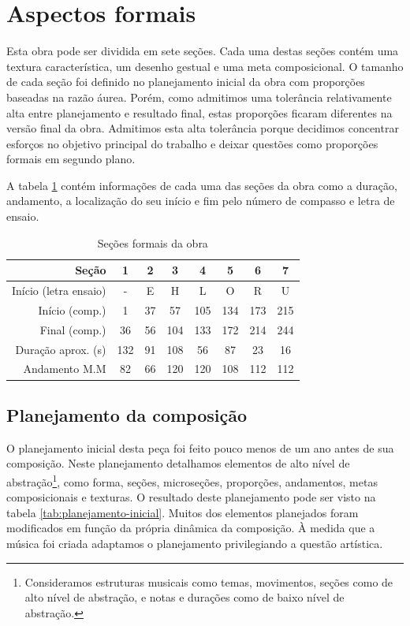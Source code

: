 \section{Aspectos formais}
\label{sec:aspectos-formais}

Esta obra pode ser dividida em sete seções. Cada uma destas seções
contém uma textura característica, um desenho gestual e uma meta
composicional.
O tamanho de cada seção foi definido no planejamento inicial da obra
com proporções baseadas na razão áurea.
Porém, como admitimos uma tolerância relativamente alta entre
planejamento e resultado final, estas proporções ficaram diferentes na
versão final da obra. Admitimos esta alta tolerância porque decidimos
concentrar esforços no objetivo principal do trabalho e deixar
questões como proporções formais em segundo plano.

A tabela \ref{tab:secoes-obra} contém informações de cada uma das
seções da obra como a duração, andamento, a localização do seu início
e fim pelo número de compasso e letra de ensaio.

\begin{table}
  \centering
  \begin{tabular}{r|ccccccc}
    Seção & 1 & 2 & 3 & 4 & 5 & 6 & 7 \\
    \hline
    Início (letra ensaio) & - & E & H & L & O & R & U \\
    Início (comp.) & 1 & 37 & 57 & 105 & 134 & 173 & 215 \\
    Final (comp.) & 36 & 56 & 104 & 133 & 172 & 214 & 244 \\
    Duração aprox. (s) & 132 & 91 & 108 & 56 & 87 & 23 & 16\\
    Andamento M.M & 82 & 66 & 120 & 120 & 108 & 112 & 112 \\
  \end{tabular}
  \caption{Seções formais da obra}
  \label{tab:secoes-obra}
\end{table}

\subsection{Planejamento da composição}
\label{sec:plan-da-comp}

O planejamento inicial desta peça foi feito pouco menos de um ano
antes de sua composição. Neste planejamento detalhamos elementos de
alto nível de abstração\footnote{Consideramos estruturas musicais como
  temas, movimentos, seções como de alto nível de abstração, e notas e
  durações como de baixo nível de abstração.}, como forma, seções,
microseções, proporções, andamentos, metas composicionais e
texturas. O resultado deste planejamento pode ser visto na tabela
\ref{tab:planejamento-inicial}. Muitos dos elementos planejados foram
modificados em função da própria dinâmica da composição. À medida que
a música foi criada adaptamos o planejamento privilegiando a questão
artística.


